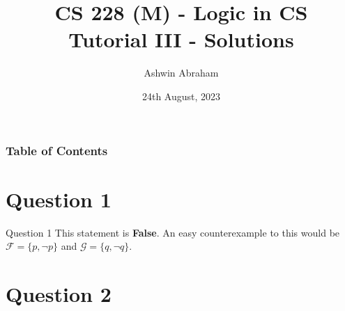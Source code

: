 \documentclass{beamer}
\title[] 
{\textbf{CS 228 (M) - Logic in CS}\\Tutorial III - Solutions}
\author[Ashwin Abraham] 
{Ashwin Abraham}
\institute[] 
{
    IIT Bombay
}
\date[2023]
{24th August, 2023}
\begin{document}
    \frame{\titlepage}

    \begin{frame}
        \frametitle{Table of Contents}
        \tableofcontents    
    \end{frame}

    \section{Question 1}
    {
        \begin{frame}{Question 1}
            This statement is \textbf{False}. An easy counterexample to this would be $\mathcal{F} = \{p, \neg p\}$ and $\mathcal{G} = \{q, \neg q\}$.
        \end{frame}
    }

    \section{Question 2}
\end{document}
